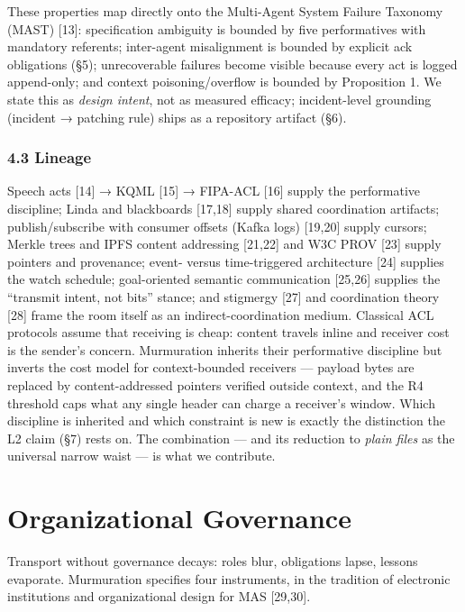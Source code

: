 \documentclass[journal]{IEEEtran}
\begin{document}
These properties map directly onto the Multi-Agent System Failure
Taxonomy (MAST) {[}13{]}: specification ambiguity is bounded by five
performatives with mandatory referents; inter-agent misalignment is
bounded by explicit ack obligations (§5); unrecoverable failures become
visible because every act is logged append-only; and context
poisoning/overflow is bounded by Proposition 1. We state this as
\emph{design intent}, not as measured efficacy; incident-level grounding
(incident → patching rule) ships as a repository artifact (§6).

\hypertarget{lineage}{%
\subsubsection{4.3 Lineage}\label{lineage}}

Speech acts {[}14{]} → KQML {[}15{]} → FIPA-ACL {[}16{]} supply the
performative discipline; Linda and blackboards {[}17,18{]} supply shared
coordination artifacts; publish/subscribe with consumer offsets (Kafka
logs) {[}19,20{]} supply cursors; Merkle trees and IPFS content
addressing {[}21,22{]} and W3C PROV {[}23{]} supply pointers and
provenance; event- versus time-triggered architecture {[}24{]} supplies
the watch schedule; goal-oriented semantic communication {[}25,26{]}
supplies the ``transmit intent, not bits'' stance; and stigmergy
{[}27{]} and coordination theory {[}28{]} frame the room itself as an
indirect-coordination medium. Classical ACL protocols assume that
receiving is cheap: content travels inline and receiver cost is the
sender's concern. Murmuration inherits their performative discipline but
inverts the cost model for context-bounded receivers --- payload bytes
are replaced by content-addressed pointers verified outside context, and
the R4 threshold caps what any single header can charge a receiver's
window. Which discipline is inherited and which constraint is new is
exactly the distinction the L2 claim (§7) rests on. The combination ---
and its reduction to \emph{plain files} as the universal narrow waist
--- is what we contribute.



\section{Organizational Governance}


Transport without governance decays: roles blur, obligations lapse,
lessons evaporate. Murmuration specifies four instruments, in the
tradition of electronic institutions and organizational design for MAS
{[}29,30{]}.
\end{document}
